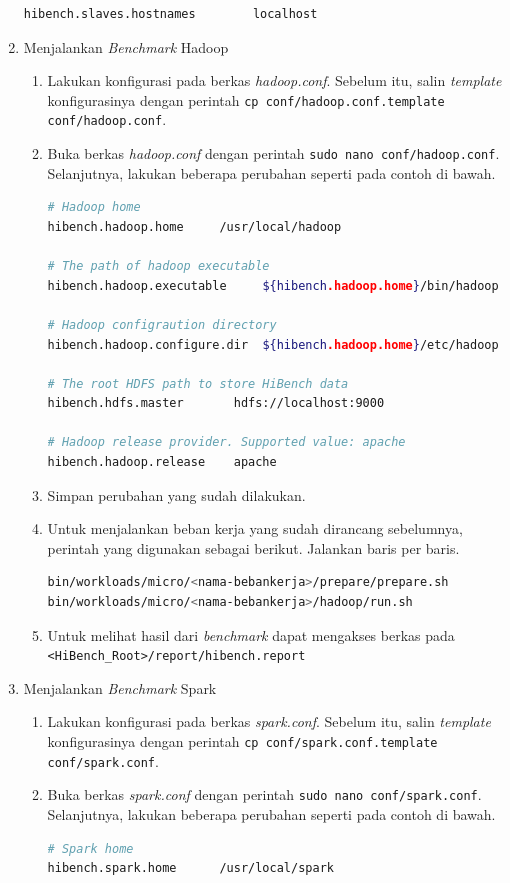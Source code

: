 \begin{enumerate}
\begin{lstlisting}[language=bash]
hibench.slaves.hostnames        localhost
    \end{lstlisting}
  \item Menjalankan \textit{Benchmark} Hadoop
  \begin{enumerate}
    \item Lakukan konfigurasi pada berkas \textit{hadoop.conf}. Sebelum itu, salin \textit{template} konfigurasinya dengan perintah \verb|cp conf/hadoop.conf.template conf/hadoop.conf|.
    \item Buka berkas \textit{hadoop.conf} dengan perintah \verb|sudo nano conf/hadoop.conf|. Selanjutnya, lakukan beberapa perubahan seperti pada contoh di bawah.
      \begin{lstlisting}[language=bash]
# Hadoop home
hibench.hadoop.home     /usr/local/hadoop

# The path of hadoop executable
hibench.hadoop.executable     ${hibench.hadoop.home}/bin/hadoop

# Hadoop configraution directory
hibench.hadoop.configure.dir  ${hibench.hadoop.home}/etc/hadoop

# The root HDFS path to store HiBench data
hibench.hdfs.master       hdfs://localhost:9000

# Hadoop release provider. Supported value: apache
hibench.hadoop.release    apache
      \end{lstlisting}
    \item Simpan perubahan yang sudah dilakukan.
    \item Untuk menjalankan beban kerja yang sudah dirancang sebelumnya, perintah yang digunakan sebagai berikut. Jalankan baris per baris.
      \begin{lstlisting}[language=bash]
bin/workloads/micro/<nama-bebankerja>/prepare/prepare.sh
bin/workloads/micro/<nama-bebankerja>/hadoop/run.sh
      \end{lstlisting}
    \item Untuk melihat hasil dari \textit{benchmark} dapat mengakses berkas pada \verb|<HiBench_Root>/report/hibench.report|
  \end{enumerate}
  \item Menjalankan \textit{Benchmark} Spark
  \begin{enumerate}
    \item Lakukan konfigurasi pada berkas \textit{spark.conf}. Sebelum itu, salin \textit{template} konfigurasinya dengan perintah \verb|cp conf/spark.conf.template conf/spark.conf|.
    \item Buka berkas \textit{spark.conf} dengan perintah \verb|sudo nano conf/spark.conf|. Selanjutnya, lakukan beberapa perubahan seperti pada contoh di bawah.
      \begin{lstlisting}[language=bash]
# Spark home
hibench.spark.home      /usr/local/spark


\end{lstlisting}
\end{enumerate}
\end{enumerate}
